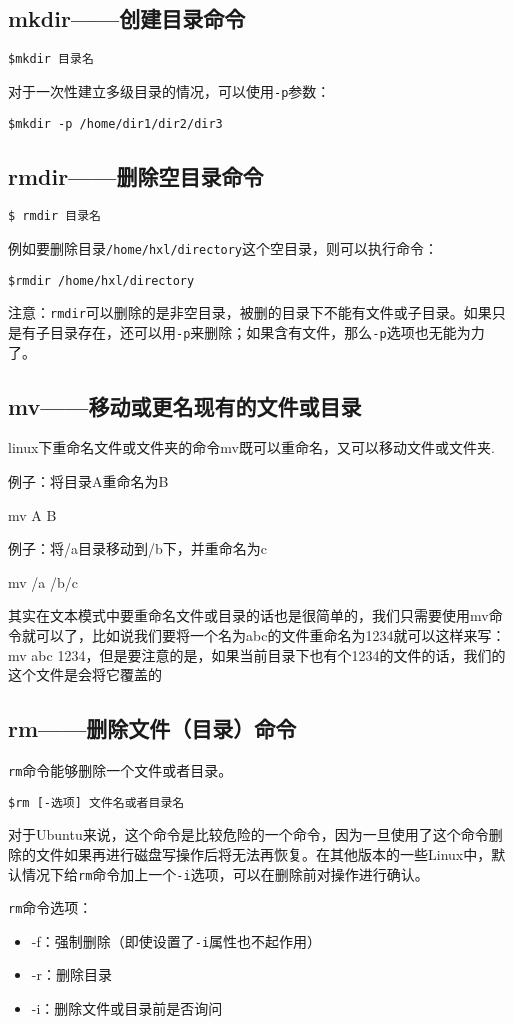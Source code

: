 \subsection{mkdir——创建目录命令}
\verb*|$mkdir 目录名|

对于一次性建立多级目录的情况，可以使用\verb*|-p|参数：

\verb*|$mkdir -p /home/dir1/dir2/dir3|


\subsection{rmdir——删除空目录命令}
\verb*|$ rmdir 目录名|

例如要删除目录\verb*|/home/hxl/directory|这个空目录，则可以执行命令：

\verb*|$rmdir /home/hxl/directory|

注意：\verb*|rmdir|可以删除的是非空目录，被删的目录下不能有文件或子目录。如果只是有子目录存在，还可以用\verb*|-p|来删除；如果含有文件，那么\verb*|-p|选项也无能为力了。


\subsection{mv——移动或更名现有的文件或目录}
linux下重命名文件或文件夹的命令mv既可以重命名，又可以移动文件或文件夹.

例子：将目录A重命名为B

mv A B

例子：将/a目录移动到/b下，并重命名为c

mv /a /b/c

其实在文本模式中要重命名文件或目录的话也是很简单的，我们只需要使用mv命令就可以了，比如说我们要将一个名为abc的文件重命名为1234就可以这样来写：mv abc 1234，但是要注意的是，如果当前目录下也有个1234的文件的话，我们的这个文件是会将它覆盖的


\subsection{rm——删除文件（目录）命令}
\verb*|rm|命令能够删除一个文件或者目录。

\verb*|$rm [-选项] 文件名或者目录名|

对于Ubuntu来说，这个命令是比较危险的一个命令，因为一旦使用了这个命令删除的文件如果再进行磁盘写操作后将无法再恢复。在其他版本的一些Linux中，默认情况下给\verb*|rm|命令加上一个\verb*|-i|选项，可以在删除前对操作进行确认。

\verb*|rm|命令选项：
\begin{itemize}
\item -f：强制删除（即使设置了\verb*|-i|属性也不起作用）
\item -r：删除目录
\item -i：删除文件或目录前是否询问
\end{itemize}


